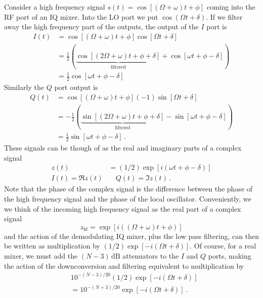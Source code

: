 Consider a high frequency signal $s(t) = \cos [ (\Omega+\omega)t + \phi ]$ coming into the RF port of an IQ mixer.
Into the LO port we put $\cos(\Omega t + \delta)$.
If we filter away the high frequency part of the outputs, the output of the $I$ port is
\begin{align}
I(t) &= \cos [ (\Omega + \omega)t + \phi ] \cos [ \Omega t + \delta ] \nonumber \\
&= \frac{1}{2}\left( \underbrace{\cos [(2\Omega + \omega)t + \phi + \delta ]}_\text{filtered} + \cos [ \omega t + \phi - \delta ] \right) \nonumber \\
&= \frac{1}{2} \cos [ \omega t + \phi - \delta ]
\end{align}
Similarly the $Q$ port output is
\begin{align}
Q(t) &= \cos [ (\Omega + \omega)t + \phi ](-1)\sin [ \Omega t + \delta ] \nonumber \\
&= -\frac{1}{2}\left( \underbrace{\sin [(2\Omega + \omega)t + \phi + \delta ]}_\text{filtered} - \sin [ \omega t + \phi - \delta ] \right) \nonumber \\
&= \frac{1}{2} \sin [ \omega t + \phi - \delta ] \, .
\end{align}
These signals can be though of as the real and imaginary parts of a complex signal
\begin{align}
z(t) &= (1/2) \exp \left[i \left( \omega t + \phi - \delta \right) \right] \\
I(t) = \Re z(t) & \quad Q(t) = \Im z(t) \, .
\end{align}
Note that the phase of the complex signal is the difference between the phase of the high frequency signal and the phase of the local oscillator.
Conveniently, we we think of the incoming high frequency signal as the real part of a complex signal
\begin{equation}
z_{\textrm{hf}} = \exp \left[ i \left( \left( \Omega + \omega \right)t +\phi \right) \right]
\end{equation}
and the action of the demodulating IQ mixer, plus the low pass filtering, can then be written as multiplication by $(1/2) \exp \left[ -i( \Omega t + \delta ) \right]$.
Of course, for a real mixer, we must add the $(N-3)\,\text{dB}$ attenuators to the $I$ and $Q$ ports, making the action of the downconversion and filtering equivalent to multiplication by
\begin{align*}
& 10^{-(N-3)/20} (1/2) \exp \left[ -i (\Omega t + \delta) \right] \\
&= 10^{-(N+3)/20} \exp \left[ -i ( \Omega t + \delta) \right] \, .
\end{align*}

